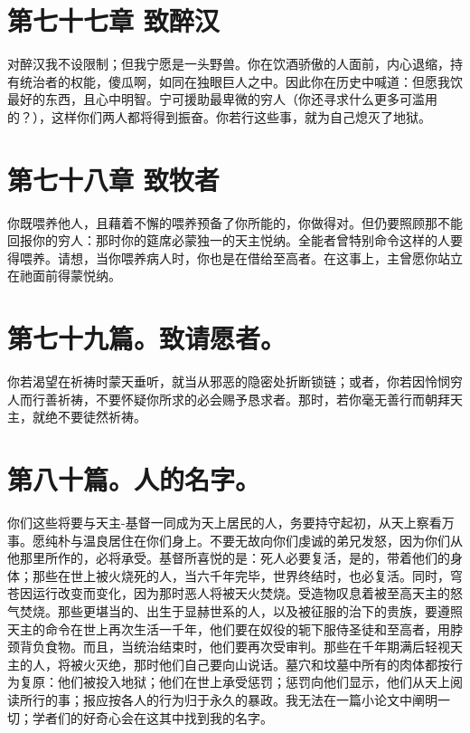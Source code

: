 
\section{第七十七章 致醉汉}

对醉汉我不设限制；但我宁愿是一头野兽。你在饮酒骄傲的人面前，内心退缩，持有统治者的权能，傻瓜啊，如同在独眼巨人之中。因此你在历史中喊道：但愿我饮最好的东西，且心中明智。宁可援助最卑微的穷人（你还寻求什么更多可滥用的？），这样你们两人都将得到振奋。你若行这些事，就为自己熄灭了地狱。\par


\section{第七十八章 致牧者}

你既喂养他人，且藉着不懈的喂养预备了你所能的，你做得对。但仍要照顾那不能回报你的穷人：那时你的筵席必蒙独一的天主悦纳。全能者曾特别命令这样的人要得喂养。请想，当你喂养病人时，你也是在借给至高者。在这事上，主曾愿你站立在祂面前得蒙悦纳。\par


\section{第七十九篇。致请愿者。}

你若渴望在祈祷时蒙天垂听，就当从邪恶的隐密处折断锁链；或者，你若因怜悯穷人而行善祈祷，不要怀疑你所求的必会赐予恳求者。那时，若你毫无善行而朝拜天主，就绝不要徒然祈祷。\par


\section{第八十篇。人的名字。}

你们这些将要与天主-基督一同成为天上居民的人，务要持守起初，从天上察看万事。愿纯朴与温良居住在你们身上。不要无故向你们虔诚的弟兄发怒，因为你们从他那里所作的，必将承受。基督所喜悦的是：死人必要复活，是的，带着他们的身体；那些在世上被火烧死的人，当六千年完毕，世界终结时，也必复活。同时，穹苍因运行改变而变化，因为那时恶人将被天火焚烧。受造物叹息着被至高天主的怒气焚烧。那些更堪当的、出生于显赫世系的人，以及被征服的治下的贵族，要遵照天主的命令在世上再次生活一千年，他们要在奴役的轭下服侍圣徒和至高者，用脖颈背负食物。而且，当统治结束时，他们要再次受审判。那些在千年期满后轻视天主的人，将被火灭绝，那时他们自己要向山说话。墓穴和坟墓中所有的肉体都按行为复原：他们被投入地狱；他们在世上承受惩罚；惩罚向他们显示，他们从天上阅读所行的事；报应按各人的行为归于永久的暴政。我无法在一篇小论文中阐明一切；学者们的好奇心会在这其中找到我的名字。\par

